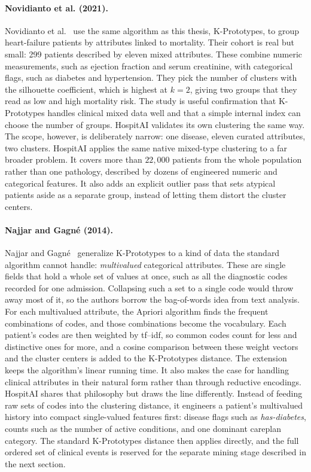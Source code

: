 \paragraph{Novidianto et al. (2021).}
Novidianto et al.~\cite{novidianto2021} use the same algorithm as this thesis, K-Prototypes, to group heart-failure patients by attributes linked to mortality.
Their cohort is real but small: 299 patients described by eleven mixed attributes.
These combine numeric measurements, such as ejection fraction and serum creatinine, with categorical flags, such as diabetes and hypertension.
They pick the number of clusters with the silhouette coefficient, which is highest at $k=2$, giving two groups that they read as low and high mortality risk.
The study is useful confirmation that K-Prototypes handles clinical mixed data well and that a simple internal index can choose the number of groups. HospitAI validates its own clustering the same way.
The scope, however, is deliberately narrow: one disease, eleven curated attributes, two clusters.
HospitAI applies the same native mixed-type clustering to a far broader problem.
It covers more than $22{,}000$ patients from the whole population rather than one pathology, described by dozens of engineered numeric and categorical features. It also adds an explicit outlier pass that sets atypical patients aside as a separate group, instead of letting them distort the cluster centers.

\paragraph{Najjar and Gagné (2014).}
Najjar and Gagné~\cite{najjar2018kproto} generalize K-Prototypes to a kind of data the standard algorithm cannot handle: \emph{multivalued} categorical attributes.
These are single fields that hold a whole set of values at once, such as all the diagnostic codes recorded for one admission.
Collapsing such a set to a single code would throw away most of it, so the authors borrow the bag-of-words idea from text analysis.
For each multivalued attribute, the Apriori algorithm finds the frequent combinations of codes, and those combinations become the vocabulary.
Each patient's codes are then weighted by tf--idf, so common codes count for less and distinctive ones for more, and a cosine comparison between these weight vectors and the cluster centers is added to the K-Prototypes distance.
The extension keeps the algorithm's linear running time. It also makes the case for handling clinical attributes in their natural form rather than through reductive encodings.
HospitAI shares that philosophy but draws the line differently.
Instead of feeding raw sets of codes into the clustering distance, it engineers a patient's multivalued history into compact single-valued features first: disease flags such as \emph{has-diabetes}, counts such as the number of active conditions, and one dominant careplan category.
The standard K-Prototypes distance then applies directly, and the full ordered set of clinical events is reserved for the separate mining stage described in the next section.

